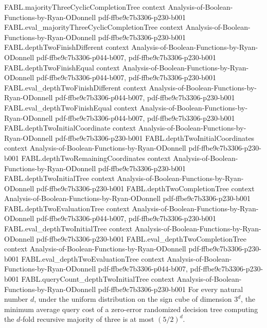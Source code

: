 \begin{theorem}
  {FABL.majorityThreeCyclicCompletionTree}
  {context}
  {Analysis-of-Boolean-Functions-by-Ryan-ODonnell}
  {pdf-ffbe9c7b3306-p230-b001}
\proofstep
  {FABL.eval_majorityThreeCyclicCompletionTree}
  {context}
  {Analysis-of-Boolean-Functions-by-Ryan-ODonnell}
  {pdf-ffbe9c7b3306-p230-b001}
\proofstep
  {FABL.depthTwoFinishDifferent}
  {context}
  {Analysis-of-Boolean-Functions-by-Ryan-ODonnell}
  {pdf-ffbe9c7b3306-p044-b007,
    pdf-ffbe9c7b3306-p230-b001}
\proofstep
  {FABL.depthTwoFinishEqual}
  {context}
  {Analysis-of-Boolean-Functions-by-Ryan-ODonnell}
  {pdf-ffbe9c7b3306-p044-b007,
    pdf-ffbe9c7b3306-p230-b001}
\proofstep
  {FABL.eval_depthTwoFinishDifferent}
  {context}
  {Analysis-of-Boolean-Functions-by-Ryan-ODonnell}
  {pdf-ffbe9c7b3306-p044-b007,
    pdf-ffbe9c7b3306-p230-b001}
\proofstep
  {FABL.eval_depthTwoFinishEqual}
  {context}
  {Analysis-of-Boolean-Functions-by-Ryan-ODonnell}
  {pdf-ffbe9c7b3306-p044-b007,
    pdf-ffbe9c7b3306-p230-b001}
\proofstep
  {FABL.depthTwoInitialCoordinate}
  {context}
  {Analysis-of-Boolean-Functions-by-Ryan-ODonnell}
  {pdf-ffbe9c7b3306-p230-b001}
\proofstep
  {FABL.depthTwoInitialCoordinates}
  {context}
  {Analysis-of-Boolean-Functions-by-Ryan-ODonnell}
  {pdf-ffbe9c7b3306-p230-b001}
\proofstep
  {FABL.depthTwoRemainingCoordinates}
  {context}
  {Analysis-of-Boolean-Functions-by-Ryan-ODonnell}
  {pdf-ffbe9c7b3306-p230-b001}
\proofstep
  {FABL.depthTwoInitialTree}
  {context}
  {Analysis-of-Boolean-Functions-by-Ryan-ODonnell}
  {pdf-ffbe9c7b3306-p230-b001}
\proofstep
  {FABL.depthTwoCompletionTree}
  {context}
  {Analysis-of-Boolean-Functions-by-Ryan-ODonnell}
  {pdf-ffbe9c7b3306-p230-b001}
\proofstep
  {FABL.depthTwoEvaluationTree}
  {context}
  {Analysis-of-Boolean-Functions-by-Ryan-ODonnell}
  {pdf-ffbe9c7b3306-p044-b007,
    pdf-ffbe9c7b3306-p230-b001}
\proofstep
  {FABL.eval_depthTwoInitialTree}
  {context}
  {Analysis-of-Boolean-Functions-by-Ryan-ODonnell}
  {pdf-ffbe9c7b3306-p230-b001}
\proofstep
  {FABL.eval_depthTwoCompletionTree}
  {context}
  {Analysis-of-Boolean-Functions-by-Ryan-ODonnell}
  {pdf-ffbe9c7b3306-p230-b001}
\proofstep
  {FABL.eval_depthTwoEvaluationTree}
  {context}
  {Analysis-of-Boolean-Functions-by-Ryan-ODonnell}
  {pdf-ffbe9c7b3306-p044-b007,
    pdf-ffbe9c7b3306-p230-b001}
\proofstep
  {FABL.queryCount_depthTwoInitialTree}
  {context}
  {Analysis-of-Boolean-Functions-by-Ryan-ODonnell}
  {pdf-ffbe9c7b3306-p230-b001}
For every natural number $d$, under the uniform distribution on the sign cube of
dimension $3^d$, the minimum average query cost of a zero-error randomized decision tree
computing the $d$-fold recursive majority of three is at most $(5/2)^d$.
\end{theorem}

